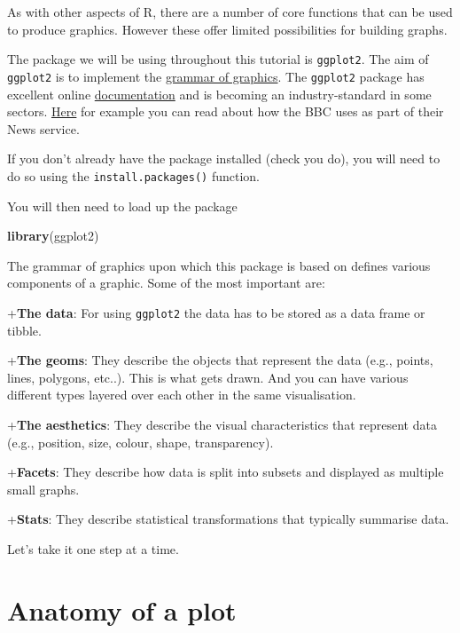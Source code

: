 \documentclass[
]{book}
\newenvironment{Shaded}{\begin{snugshade}}{\end{snugshade}}
\newcommand{\FunctionTok}[1]{\textcolor[rgb]{0.13,0.29,0.53}{\textbf{#1}}}
\newcommand{\NormalTok}[1]{#1}
\begin{document}
As with other aspects of R, there are a number of core functions that can be used to produce graphics. However these offer limited possibilities for building graphs.

The package we will be using throughout this tutorial is \texttt{ggplot2}. The aim of \texttt{ggplot2} is to implement the \href{http://www.springer.com/statistics/computational+statistics/book/978-0-387-24544-7}{grammar of graphics}. The \texttt{ggplot2} package has excellent online \href{https://ggplot2.tidyverse.org/}{documentation} and is becoming an industry-standard in some sectors. \href{https://medium.com/bbc-visual-and-data-journalism/how-the-bbc-visual-and-data-journalism-team-works-with-graphics-in-r-ed0b35693535}{Here} for example you can read about how the BBC uses as part of their News service.

If you don't already have the package installed (check you do), you will need to do so using the \texttt{install.packages()} function.

You will then need to load up the package

\begin{Shaded}
\begin{Highlighting}[]
\FunctionTok{library}\NormalTok{(ggplot2)                                  }
\end{Highlighting}
\end{Shaded}

The grammar of graphics upon which this package is based on defines various components of a graphic. Some of the most important are:

+\textbf{The data}: For using \texttt{ggplot2} the data has to be stored as a data frame or tibble.

+\textbf{The geoms}: They describe the objects that represent the data (e.g., points, lines, polygons, etc..). This is what gets drawn. And you can have various different types layered over each other in the same visualisation.

+\textbf{The aesthetics}: They describe the visual characteristics that represent data (e.g., position, size, colour, shape, transparency).

+\textbf{Facets}: They describe how data is split into subsets and displayed as multiple small graphs.

+\textbf{Stats}: They describe statistical transformations that typically summarise data.

Let's take it one step at a time.

\section{Anatomy of a plot}\label{anatomy-of-a-plot}
\end{document}
